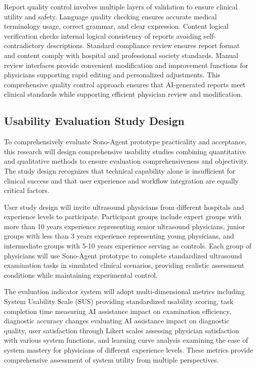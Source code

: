Report quality control involves multiple layers of validation to ensure clinical utility and safety. Language quality checking ensures accurate medical terminology usage, correct grammar, and clear expression. Content logical verification checks internal logical consistency of reports avoiding self-contradictory descriptions. Standard compliance review ensures report format and content comply with hospital and professional society standards. Manual review interfaces provide convenient modification and improvement functions for physicians supporting rapid editing and personalized adjustments. This comprehensive quality control approach ensures that AI-generated reports meet clinical standards while supporting efficient physician review and modification.

\subsection{Usability Evaluation Study Design}

To comprehensively evaluate Sono-Agent prototype practicality and acceptance, this research will design comprehensive usability studies combining quantitative and qualitative methods to ensure evaluation comprehensiveness and objectivity. The study design recognizes that technical capability alone is insufficient for clinical success and that user experience and workflow integration are equally critical factors.

User study design will invite ultrasound physicians from different hospitals and experience levels to participate. Participant groups include expert groups with more than 10 years experience representing senior ultrasound physicians, junior groups with less than 3 years experience representing young physicians, and intermediate groups with 5-10 years experience serving as controls. Each group of physicians will use Sono-Agent prototype to complete standardized ultrasound examination tasks in simulated clinical scenarios, providing realistic assessment conditions while maintaining experimental control.

The evaluation indicator system will adopt multi-dimensional metrics including System Usability Scale (SUS) providing standardized usability scoring, task completion time measuring AI assistance impact on examination efficiency, diagnostic accuracy changes evaluating AI assistance impact on diagnostic quality, user satisfaction through Likert scales assessing physician satisfaction with various system functions, and learning curve analysis examining the ease of system mastery for physicians of different experience levels. These metrics provide comprehensive assessment of system utility from multiple perspectives.

